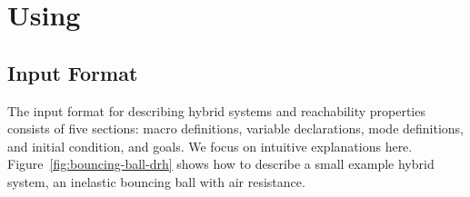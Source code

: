 \section{Using \dReach{}}\label{sec:using-dreach}
\subsection{Input Format}\label{sec:input-format}
The input format for describing hybrid systems and reachability properties consists of five
sections: macro definitions, variable declarations, mode definitions,
and initial condition, and goals. We focus on intuitive explanations here.
Figure~\ref{fig:bouncing-ball-drh} shows how to describe a small
example hybrid system, an inelastic bouncing ball with air resistance.

